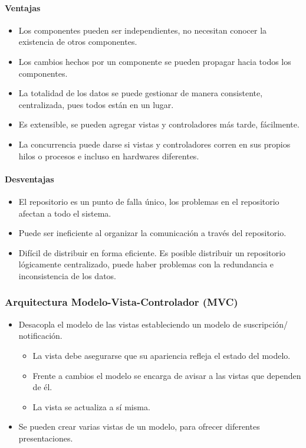 \paragraph{Ventajas}
\begin{itemize}
	\item Los componentes pueden ser independientes, no necesitan conocer la existencia de otros componentes.
	\item Los cambios hechos por un componente se pueden propagar hacia todos los componentes.
	\item La totalidad de los datos se puede gestionar de manera consistente, centralizada, pues todos están en un lugar.
	\item Es extensible, se pueden agregar vistas y controladores más tarde, fácilmente.
	\item La concurrencia puede darse si vistas y controladores corren en sus propios hilos o procesos e incluso en hardwares diferentes.
\end{itemize}
\paragraph{Desventajas}
\begin{itemize}
	\item El repositorio es un punto de falla único, los problemas en el repositorio afectan a todo el sistema.
	\item Puede ser ineficiente al organizar la comunicación a través del repositorio.
	\item Difícil de distribuir en forma eficiente. Es posible distribuir un repositorio lógicamente centralizado, puede haber problemas con la redundancia e inconsistencia de los datos.
\end{itemize}
\subsubsection{Arquitectura Modelo-Vista-Controlador (MVC)}
\begin{itemize}
	\item Desacopla el modelo de las vistas estableciendo un modelo de suscripción/ notificación.
	\begin{itemize}
		\item La vista debe asegurarse que su apariencia refleja el estado del modelo.
		\item Frente a cambios el modelo se encarga de avisar a las vistas que dependen de él.
		\item La vista se actualiza a sí misma.
	\end{itemize}
	\item Se pueden crear varias vistas de un modelo, para ofrecer diferentes presentaciones.
\end{itemize}
